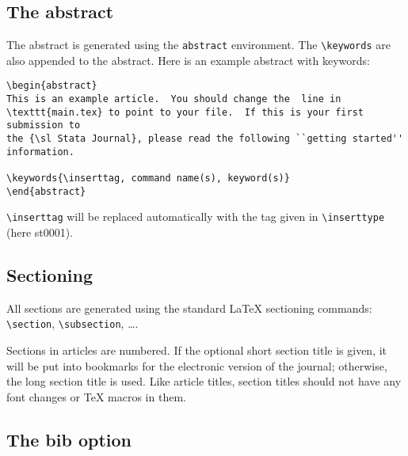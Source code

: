 \clearpage
\subsection{The abstract}

The abstract is generated using the \texttt{abstract} environment.  The
\verb+\keywords+ are also appended to the abstract.  Here is an
example abstract with keywords:

\begin{stverbatim}
\begin{verbatim}
\begin{abstract}
This is an example article.  You should change the  line in
\texttt{main.tex} to point to your file.  If this is your first submission to
the {\sl Stata Journal}, please read the following ``getting started''
information.

\keywords{\inserttag, command name(s), keyword(s)}
\end{abstract}
\end{verbatim}
\end{stverbatim}

\verb+\inserttag+ will be replaced automatically with the tag
given in \verb+\inserttype+ (here st0001).

\subsection{Sectioning}

All sections are generated using the standard {\LaTeX} sectioning commands:\\
\verb+\section+, \verb+\subsection+, \dots.

Sections in articles are numbered.  If the optional short section title is
given, it will be put into bookmarks for the electronic version of the
journal; otherwise, the long section title is used.  Like article titles,
section titles should not have any font changes or {\TeX} macros in them.

\subsection{The bib option}

